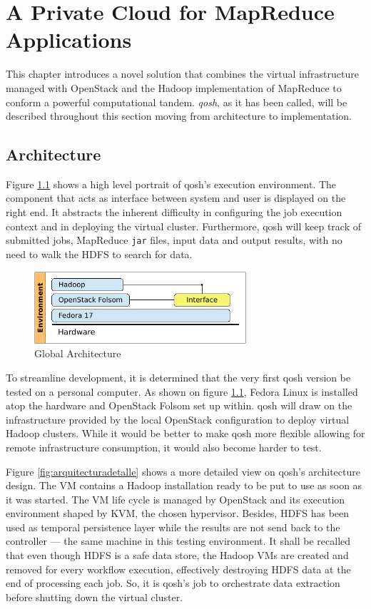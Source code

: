 \chapter{A Private Cloud for MapReduce Applications}\label{cap:solucion}
\noindent This chapter introduces a novel solution that combines the virtual infrastructure managed with OpenStack and the Hadoop implementation of MapReduce to conform a powerful computational tandem. \emph{qosh}, as it has been called, will be described throughout this section moving from architecture to implementation.

\section{Architecture}\label{sec:diseno}
\noindent Figure \ref{fig:arquitecturaglobal} shows a high level portrait of qosh's execution environment. The component that acts as interface between system and user is displayed on the right end. It abstracts the inherent difficulty in configuring the job execution context and in deploying the virtual cluster. Furthermore, qosh will keep track of submitted jobs, MapReduce \texttt{jar} files, input data and output results, with no need to walk the HDFS to search for data.

\begin{figure}[tbp]
\begin{center}
\includegraphics[width=0.7\textwidth]{imagenes/021.pdf}
 \caption{Global Architecture}
\label{fig:arquitecturaglobal}
\end{center}
\end{figure}

To streamline development, it is determined that the very first qosh version be tested on a personal computer. As shown on figure \ref{fig:arquitecturaglobal}, Fedora Linux is installed atop the hardware and OpenStack Folsom set up within. qosh will draw on the infrastructure provided by the local OpenStack configuration to deploy virtual Hadoop clusters. While it would be better to make qosh more flexible allowing for remote infrastructure consumption, it would also become harder to test.

Figure \ref{fig:arquitecturadetalle} shows a more detailed view on qosh's architecture design. The VM contains a Hadoop installation ready to be put to use as soon as it was started. The VM life cycle is managed by OpenStack and its execution environment shaped by KVM, the chosen hypervisor. Besides, HDFS has been used as temporal persistence layer while the results are not send back to the controller --- the same machine in this testing environment. It shall be recalled that even though HDFS is a safe data store, the Hadoop VMs are created and removed for every workflow execution, effectively destroying HDFS data at the end of processing each job. So, it is qosh's job to orchestrate data extraction before shutting down the virtual cluster.


